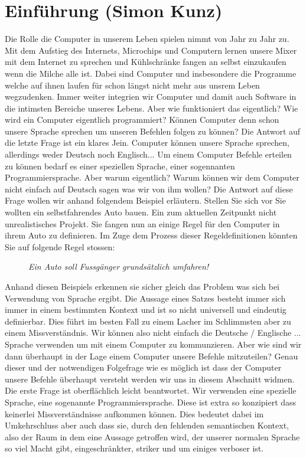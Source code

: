 \documentclass[a4paper, 12pt]{article}
\begin{document}
\section{Einf\"uhrung (Simon Kunz)}
Die Rolle die Computer in unserem Leben spielen nimmt von Jahr zu Jahr
zu. Mit dem Aufstieg des Internets, Microchips und Computern lernen unsere
Mixer mit dem Internet zu sprechen und K\"uhlschr\"anke fangen an selbst einzukaufen wenn die Milche alle ist. Dabei sind Computer und insbesondere die
Programme welche auf ihnen laufen f\"ur schon l\"angst nicht mehr aus unsrem
Leben wegzudenken. Immer weiter integrien wir Computer und damit auch
Software in die intimsten Bereiche unseres Lebens. Aber wie funktioniert das
eigentlich? Wie wird ein Computer eigentlich programmiert? K\"onnen Computer denn schon unsere Sprache sprechen um unseren Befehlen folgen zu k\"onnen? Die Antwort auf die letzte Frage ist ein klares Jein. Computer k\"onnen
unsere Sprache sprechen, allerdings weder Deutsch noch Englisch... Um einem
Computer Befehle erteilen zu k\"onnen bedarf es einer speziellen Sprache, einer
sogennanten Programmiersprache. Aber warum eigentlich? Warum k\"onnen
wir dem Computer nicht einfach auf Deutsch sagen was wir von ihm wollen?
Die Antwort auf diese Frage wollen wir anhand folgendem Beispiel erl\"autern.
Stellen Sie sich vor Sie wollten ein selbstfahrendes Auto bauen. Ein zum aktuellen Zeitpunkt nicht unrealistisches Projekt. Sie fangen nun an einige Regel
f\"ur den Computer in ihrem Auto zu definieren. Im Zuge dem Prozess dieser
Regeldefinitionen k\"onnten Sie auf folgende Regel stossen:

\begin{figure}[h]
  \centering
  \emph{Ein Auto soll Fussg\"anger grunds\"atzlich umfahren!}
\end{figure}

Anhand diesen Beispiels erkennen sie sicher gleich das Problem was sich bei
Verwendung von Sprache ergibt. Die Aussage eines Satzes besteht immer sich immer
in einem bestimmten Kontext und ist so nicht universell und eindeutig definierbar. Dies f\"uhrt im besten Fall zu einem Lacher im Schlimmsten aber zu
einem Missverst\"andnis.
Wir k\"onnen also nicht einfach die Deutsche / Englische ... Sprache verwenden
um mit einem Computer zu kommunzieren. Aber wie sind wir dann \"uberhaupt
in der Lage einem Computer unsere Befehle mitzuteilen?
Genau dieser und der notwendigen Folgefrage wie es m\"oglich ist dass der Computer unsere Befehle \"uberhaupt versteht werden wir uns in diesem Abschnitt
widmen.
Die erste Frage ist oberfl\"achlich leicht beantwortet. Wir verwenden eine spezielle Sprache, eine sogenannte Programmiersprache. Diese ist extra so konzipiert
dass keinerlei Missverst\"andnisse aufkommen k\"onnen. Dies bedeutet dabei im
Umkehrschluss aber auch dass sie, durch den fehlenden semantischen Kontext,
also der Raum in dem eine Aussage getroffen wird, der unserer normalen Sprache so viel Macht gibt, eingeschr\"ankter, striker und um einiges verboser ist.
\end{document}
